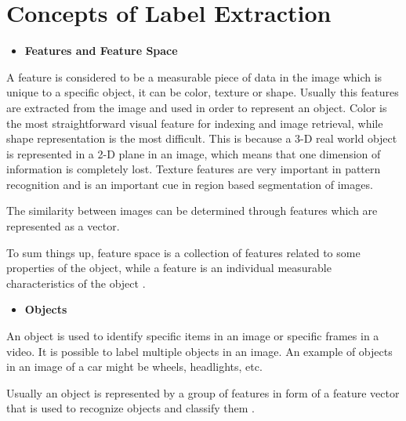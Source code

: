 \newpage

    
\section{Concepts of Label Extraction}
\label{sec:fundamental}




\begin{itemize}
    \item \textbf{Features and Feature Space}
\end{itemize}

    \label{sec:featurespace}
    \par A feature is considered to be a measurable piece of data in the image which is unique to a specific object, it can be color, texture or shape. Usually this features are extracted from the image and used in order to represent an object. Color is the most straightforward visual feature for indexing and image retrieval, while shape representation is the most difficult. This is because a 3-D real world object is represented in a 2-D plane in an image, which means that one dimension of information is completely lost. Texture features are very important in pattern recognition and is an important cue in region based segmentation of images.

    \par The similarity between images can be determined through features which are represented as a vector. 

    \par To sum things up, feature space is a collection of features related to some properties of the object, while a feature is an individual measurable characteristics of the object \cite{Tiwari2013}.

    \begin{itemize}
        \item \textbf{Objects}
    \end{itemize}

 
    \par An object is used to identify specific items in an image or specific frames in a video. It is possible to label multiple objects in an image. An example of objects in an image of a car might be wheels, headlights, etc.
    \par Usually an object is represented by a group of features in form of a feature vector that is used to recognize objects and classify them \cite{Tiwari2013}.

